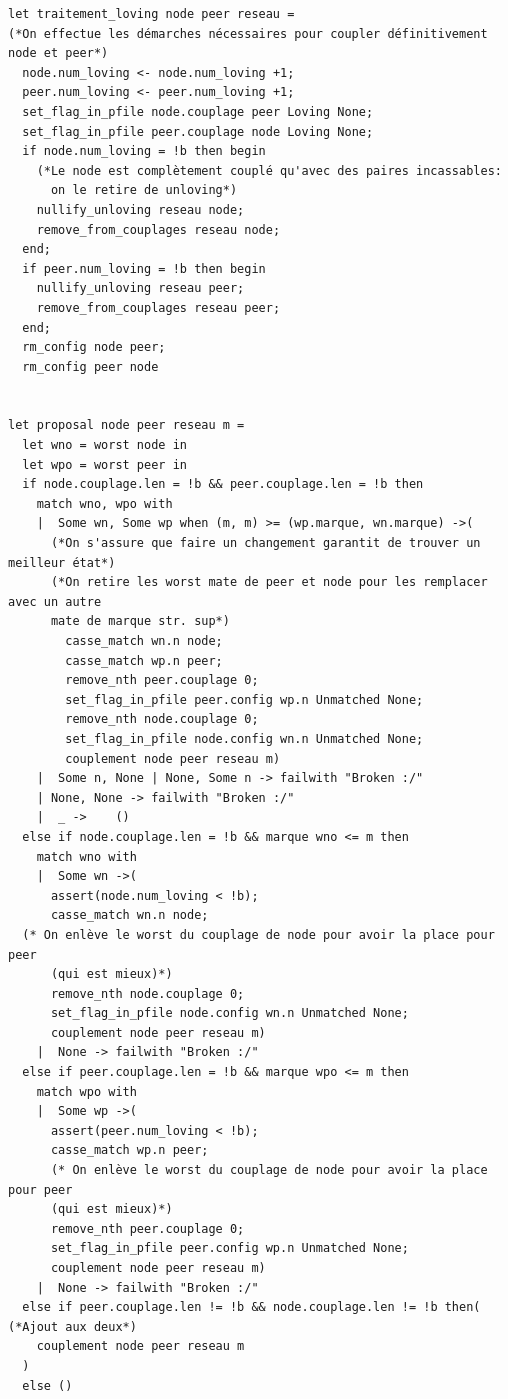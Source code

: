 \documentclass[12pt,a4paper]{article}
\begin{document}
\begin{verbatim}
let traitement_loving node peer reseau = 
(*On effectue les démarches nécessaires pour coupler définitivement node et peer*)
  node.num_loving <- node.num_loving +1;
  peer.num_loving <- peer.num_loving +1;
  set_flag_in_pfile node.couplage peer Loving None;
  set_flag_in_pfile peer.couplage node Loving None;
  if node.num_loving = !b then begin 
    (*Le node est complètement couplé qu'avec des paires incassables:
      on le retire de unloving*)
    nullify_unloving reseau node; 
    remove_from_couplages reseau node;
  end;
  if peer.num_loving = !b then begin
    nullify_unloving reseau peer;
    remove_from_couplages reseau peer;
  end;
  rm_config node peer;
  rm_config peer node
  

let proposal node peer reseau m =
  let wno = worst node in 
  let wpo = worst peer in
  if node.couplage.len = !b && peer.couplage.len = !b then 
    match wno, wpo with 
    |  Some wn, Some wp when (m, m) >= (wp.marque, wn.marque) ->( 
      (*On s'assure que faire un changement garantit de trouver un meilleur état*)
      (*On retire les worst mate de peer et node pour les remplacer avec un autre 
      mate de marque str. sup*)
        casse_match wn.n node;
        casse_match wp.n peer;
        remove_nth peer.couplage 0;
        set_flag_in_pfile peer.config wp.n Unmatched None;
        remove_nth node.couplage 0;
        set_flag_in_pfile node.config wn.n Unmatched None;
        couplement node peer reseau m)
    |  Some n, None | None, Some n -> failwith "Broken :/"
    | None, None -> failwith "Broken :/"
    |  _ ->    ()
  else if node.couplage.len = !b && marque wno <= m then
    match wno with 
    |  Some wn ->( 
      assert(node.num_loving < !b);
      casse_match wn.n node;      
  (* On enlève le worst du couplage de node pour avoir la place pour peer 
      (qui est mieux)*)
      remove_nth node.couplage 0;
      set_flag_in_pfile node.config wn.n Unmatched None;
      couplement node peer reseau m)
    |  None -> failwith "Broken :/"
  else if peer.couplage.len = !b && marque wpo <= m then 
    match wpo with 
    |  Some wp ->( 
      assert(peer.num_loving < !b);
      casse_match wp.n peer;      
      (* On enlève le worst du couplage de node pour avoir la place pour peer 
      (qui est mieux)*)
      remove_nth peer.couplage 0;
      set_flag_in_pfile peer.config wp.n Unmatched None;
      couplement node peer reseau m)
    |  None -> failwith "Broken :/"
  else if peer.couplage.len != !b && node.couplage.len != !b then( (*Ajout aux deux*)
    couplement node peer reseau m
  )
  else ()



\end{verbatim}
\end{document}
